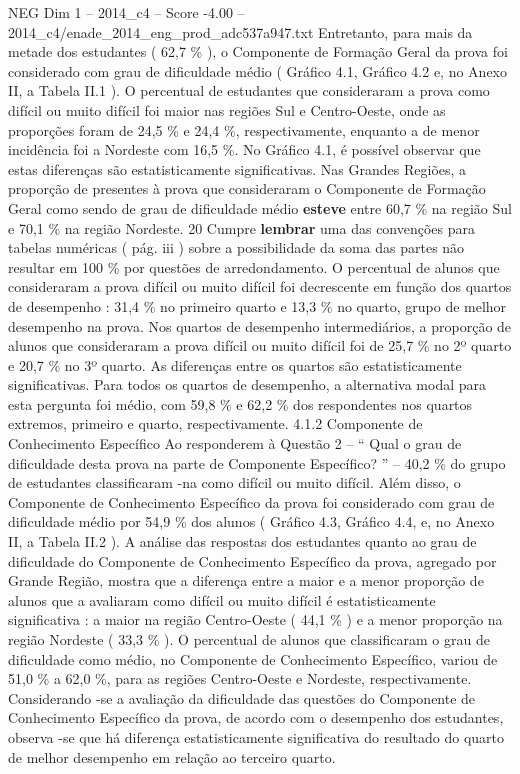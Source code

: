 \begin{textsample}{NEG Dim 1 – 2014\_c4 – Score -4.00 – 2014\_c4/enade\_2014\_eng\_prod\_adc537a947.txt}
Entretanto, para mais da metade dos estudantes ( 62,7 \% ), o Componente de Formação Geral da prova foi considerado com grau de dificuldade médio ( Gráfico 4.1, Gráfico 4.2 e, no Anexo II, a Tabela II.1 ).
O percentual de estudantes que consideraram a prova como difícil ou muito difícil foi maior nas regiões Sul e Centro-Oeste, onde as proporções foram de 24,5 \% e 24,4 \%, respectivamente, enquanto a de menor incidência foi a Nordeste com 16,5 \%.
No Gráfico 4.1, é possível observar que estas diferenças são estatisticamente significativas.
Nas Grandes Regiões, a proporção de presentes à prova que consideraram o Componente de Formação Geral como sendo de grau de dificuldade médio \textbf{esteve} entre 60,7 \% na região Sul e 70,1 \% na região Nordeste. 20 Cumpre \textbf{lembrar} uma das convenções para tabelas numéricas ( pág. iii ) sobre a possibilidade da soma das partes não resultar em 100 \% por questões de arredondamento.
O percentual de alunos que consideraram a prova difícil ou muito difícil foi decrescente em função dos quartos de desempenho : 31,4 \% no primeiro quarto e 13,3 \% no quarto, grupo de melhor desempenho na prova.
Nos quartos de desempenho intermediários, a proporção de alunos que consideraram a prova difícil ou muito difícil foi de 25,7 \% no 2º quarto e 20,7 \% no 3º quarto.
As diferenças entre os quartos são estatisticamente significativas.
Para todos os quartos de desempenho, a alternativa modal para esta pergunta foi médio, com 59,8 \% e 62,2 \% dos respondentes nos quartos extremos, primeiro e quarto, respectivamente. 4.1.2 Componente de Conhecimento Específico Ao responderem à Questão 2 – “ Qual o grau de dificuldade desta prova na parte de Componente Específico? ” – 40,2 \% do grupo de estudantes classificaram -na como difícil ou muito difícil.
Além disso, o Componente de Conhecimento Específico da prova foi considerado com grau de dificuldade médio por 54,9 \% dos alunos ( Gráfico 4.3, Gráfico 4.4, e, no Anexo II, a Tabela II.2 ).
A análise das respostas dos estudantes quanto ao grau de dificuldade do Componente de Conhecimento Específico da prova, agregado por Grande Região, mostra que a diferença entre a maior e a menor proporção de alunos que a avaliaram como difícil ou muito difícil é estatisticamente significativa : a maior na região Centro-Oeste ( 44,1 \% ) e a menor proporção na região Nordeste ( 33,3 \% ).
O percentual de alunos que classificaram o grau de dificuldade como médio, no Componente de Conhecimento Específico, variou de 51,0 \% a 62,0 \%, para as regiões Centro-Oeste e Nordeste, respectivamente.
Considerando -se a avaliação da dificuldade das questões do Componente de Conhecimento Específico da prova, de acordo com o desempenho dos estudantes, observa -se que há diferença estatisticamente significativa do resultado do quarto de melhor desempenho em relação ao terceiro quarto.

\end{textsample}
